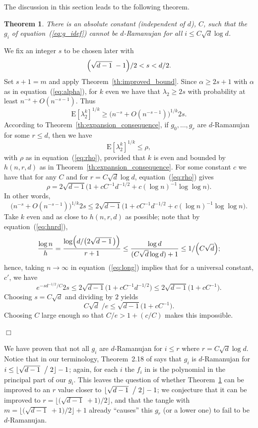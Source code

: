 \documentclass[12pt]{article}
\newtheorem{theorem}{Theorem}[section]
\newcommand{\dtreelike}{{$d$-Ramanujan}}
\newcommand{\E}[1]{\mbox{E}\left[#1\right] }
\newcommand{\proof}{{\par\noindent {\bf Proof}\space\space}}
\newcommand{\proofbox}{\begin{flushright}$\Box$\end{flushright}}
\begin{document}
The discussion in this section leads to the following theorem.
\begin{theorem}\label{th:nottreelike}
There is an absolute constant (independent of $d$), $C$, such that the
$g_i$ of equation~(\ref{eq:g_idef}) cannot be {\dtreelike}
for all $i\le C\sqrt{d}\log d$.
\end{theorem}
\proof 
We fix an integer $s$ to be chosen later with 
$$
\Bigl( \sqrt{d-1} \; -1 \Bigr)/2 < s < d/2.
$$
Set $s+1=m$ and apply Theorem~\ref{th:improved_bound}.
Since $\alpha\ge 2s+1$ with $\alpha$ as
in equation~(\ref{eq:alpha}), for $k$ even we have that $\lambda_2\ge 2s$
with probability at least $n^{-s}+O(n^{-s-1})$.  Thus
$$
\E{ \lambda_2^k}^{1/k} \ge \bigl(n^{-s}+O(n^{-s-1})\bigr)^{1/k} 2s.
$$
According to Theorem~\ref{th:expansion_consequence}, if $g_0,\ldots,g_r$
are {\dtreelike} for some $r\le d$, then we have
$$
\E{ \lambda_2^k}^{1/k} \le \rho,
$$
with $\rho$ as in equation~(\ref{eq:rho}), provided that $k$ is even and
bounded by $h(n,r,d)$ as in Theorem~\ref{th:expansion_consequence}.
For some constant $c$ we have that for any $C$ and for
$r=C\sqrt{d}\log d$, equation~(\ref{eq:rho}) gives
$$
\rho =2\sqrt{d-1} \bigl(1 + cC^{-1}d^{-1/2}+c(\log n)^{-1}\log\log n\bigr).
$$
In other words,
\begin{equation}\label{eq:long}
\bigl(n^{-s}+O(n^{-s-1})\bigr)^{1/k} 2s \le
2\sqrt{d-1} \bigl(1 + cC^{-1}d^{-1/2}+c(\log n)^{-1}\log\log n\bigr).
\end{equation}
Take $k$ even and as close to $h(n,r,d)$ as possible;
note that by equation~(\ref{eq:hnrd}),
$$
\frac{\log n}{h}=
\frac{ \log\Bigl( d/\bigl(2\sqrt{d-1}\,\bigr)\Bigr)}{r+1} \le
\frac{\log d}{(C\sqrt{d}\log d)+1} \le 1/\Bigl(C\sqrt{d}\Bigr);
$$
hence, taking $n\to\infty$ in
equation~(\ref{eq:long}) implies that
for a universal constant, $c'$, we have
$$
e^{-sd^{-1/2}/C}2s\le 2\sqrt{d-1} \bigl(1 + cC^{-1}d^{-1/2}\bigr)
\le 2\sqrt{d-1}\bigl(1 + cC^{-1}\bigr) .
$$
Choosing $s=C\sqrt{d}$ and dividing by $2$ yields
$$
C\sqrt{d}\;/e \le \sqrt{d-1} \bigl(1 + cC^{-1}\bigr).
$$
Choosing $C$ large enough so that $C/e> 1+(c/C)$ makes this impossible.
\proofbox


We have proven that not all $g_i$ are {\dtreelike} for $i\le r$ where
$r=C\sqrt{d}\log d$.
Notice that in our terminology, Theorem~2.18 of \cite{friedman_random_graphs}
says that $g_i$ is {\dtreelike} for 
$i\le\lfloor \sqrt{d-1}\;\bigm/2 \rfloor-1$;
again, for each $i$ the $f_i$ in \cite{friedman_random_graphs} is the
polynomial in the principal part of our $g_i$.
This leaves the question of
whether Theorem~\ref{th:nottreelike} can be improved to an $r$ value closer
to $\lfloor \sqrt{d-1}\;\bigm/2 \rfloor-1$; we conjecture that it can
be improved to $r=\lfloor \bigl(\sqrt{d-1}\;+1\bigr)/2 \rfloor$, and
that the tangle with $m=\lfloor \bigl(\sqrt{d-1}\;+1\bigr)/2
\rfloor+1$ already ``causes'' this $g_r$ (or a lower one)
to fail to be {\dtreelike}.
\end{document}
